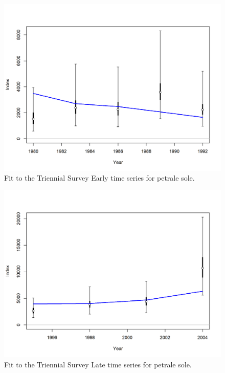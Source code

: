 \documentclass[12pt,]{article}
\begin{document}
\FloatBarrier

\begin{figure}
\centering
\includegraphics{r4ss/plots_mod1/index2_cpuefit_AFSC NWFSC West Coast Triennial Shelf Survey - Early.png}
\caption{Fit to the Triennial Survey Early time series for petrale sole.
\label{fig:fit_tri_early}}
\end{figure}

\FloatBarrier 

\begin{figure}
\centering
\includegraphics{r4ss/plots_mod1/index2_cpuefit_AFSC NWFSC West Coast Triennial Shelf Survey - Late.png}
\caption{Fit to the Triennial Survey Late time series for petrale sole.
\label{fig:fit_tri_late}}
\end{figure}
\end{document}
